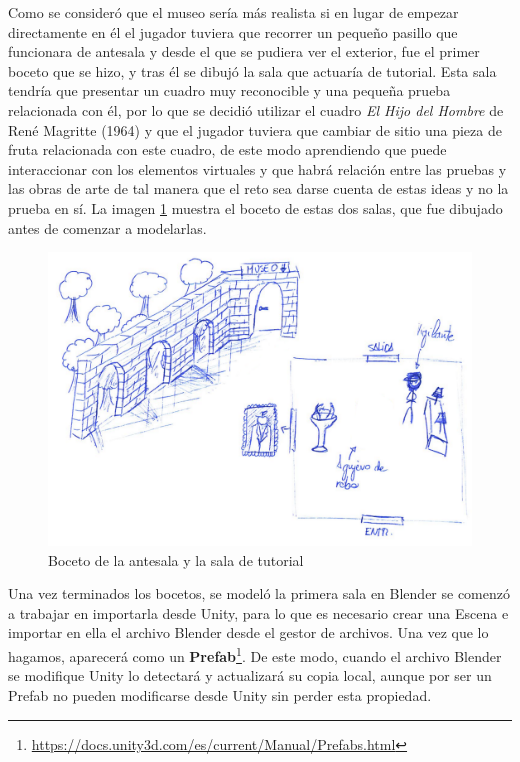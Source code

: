 Como se consideró que el museo sería más realista si en lugar de empezar directamente en él el jugador tuviera que recorrer un pequeño pasillo que funcionara de antesala y desde el que se pudiera ver el exterior, fue el primer boceto que se hizo, y tras él se dibujó la sala que actuaría de tutorial. Esta sala tendría que presentar un cuadro muy reconocible y una pequeña prueba relacionada con él, por lo que se decidió utilizar el cuadro \textit{El Hijo del Hombre} de René Magritte (1964) y que el jugador tuviera que cambiar de sitio una pieza de fruta relacionada con este cuadro, de este modo aprendiendo que puede interaccionar con los elementos virtuales y que habrá relación entre las pruebas y las obras de arte de tal manera que el reto sea darse cuenta de estas ideas y no la prueba en sí. La imagen \ref{fig:bocetos-salas-0-1} muestra el boceto de estas dos salas, que fue dibujado antes de comenzar a modelarlas.

\begin{figure}[!h]
\begin{center}
\includegraphics[width=.8\textwidth]{imagenes/7/bocetos/boceto-sala-0-1.png}
\caption{Boceto de la antesala y la sala de tutorial}
\label{fig:bocetos-salas-0-1}
\end{center}
\end{figure}

Una vez terminados los bocetos, se modeló la primera sala en Blender se comenzó a trabajar en importarla desde Unity, para lo que es necesario crear una Escena e importar en ella el archivo Blender desde el gestor de archivos. Una vez que lo hagamos, aparecerá como un \textbf{Prefab}\footnote{\url{https://docs.unity3d.com/es/current/Manual/Prefabs.html}}. De este modo, cuando el archivo Blender se modifique Unity lo detectará y actualizará su copia local, aunque por ser un Prefab no pueden modificarse desde Unity sin perder esta propiedad.

